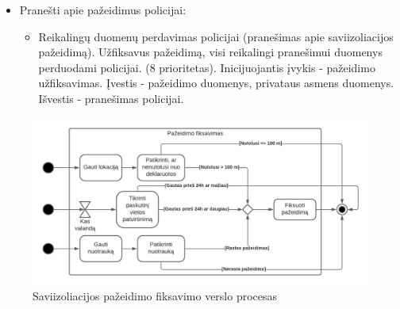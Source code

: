\documentclass{VUMIFPSkursinis}
\begin{document}
\begin{itemize}
\begin{itemize}
		\item Saviizoliacijos laikymosi patvirtinimas. Privatus asmuo, kuriam reikalinga saviizoliacija, gauna pranešimą apie reikalingą saviizoliacijos patvirtinimą. Patvirtinti saviizoliaciją jis gali atsiųsdamas savo lokaciją arba nuotrauką. (5 prioritetas). Inicijuojantis įvykis - privataus asmens buvimo vietos arba nuotraukos pateikimas. Įvestis - nuotrauka arba buvimo vieta. Išvestis - saviizoliacijos patvirtinimas.
		\item Saviizoliacijos pažeidimo fiksavimas. Privačiam asmeniui, kuris tvirtina savo saviizoliaciją dalindamasis buvimo vieta, atsiuntus koordinates, nutolusias nuo deklaruotos saviizoliacijos vietos daugiau nei 100 metrų, fiksuojamas saviizoliacijos pažeidimas. 
	Jei atsiunčiama nuotrauką ir randamas pažeidimas, jis fiksuojamas (\ref{img:business_process_identify_violation} pav.). (6 prioritetas). Inicijuojantis įvykis - kalendorinis (kas vaklandą) arba saviizoliacijos patvirtinimas (buvimo vieta / nuotrauka). Įvestis - privataus asmens saviizoliacijos patvirtinimai. Išvestis - užfiksuotas pažeidimas.
	\end{itemize}
	\item Pranešti apie pažeidimus policijai:
	\begin{itemize}
		\item Reikalingų duomenų perdavimas policijai (pranešimas apie saviizoliacijos pažeidimą). Užfiksavus pažeidimą, visi reikalingi pranešimui duomenys perduodami policijai. (8 prioritetas). Inicijuojantis įvykis - pažeidimo užfiksavimas. Įvestis - pažeidimo duomenys, privataus asmens duomenys. Išvestis - pranešimas policijai.
	\end{itemize}
\end{itemize}

\begin{figure}[H]
	\centering
	\includegraphics[scale=0.7]{img/business_process_identify_violation.png}
	\caption{Saviizoliacijos pažeidimo fiksavimo verslo procesas}
	\label{img:business_process_identify_violation}
\end{figure}
\end{document}
